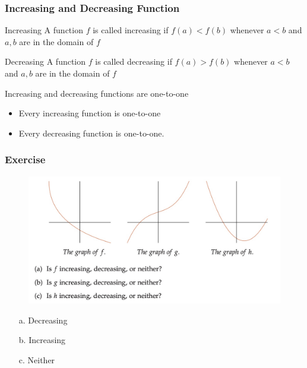\documentclass{beamer}
\begin{document}
  \begin{frame}
    \frametitle{Increasing and Decreasing Function}
    \begin{block}{Increasing}
      A function \(f\) is called increasing if \(f (a) < f (b)\) whenever \(a < b\) and \(a, b \) are in
the domain of \(f\)
    \end{block}
    \begin{block}{Decreasing}
      A function \(f\) is called decreasing if \(f (a) >  f (b)\) whenever \(a < b\) and \(a, b \) are in
the domain of \(f\)
    \end{block}
    \begin{alertblock}{Increasing and decreasing functions are one-to-one}
      \begin{itemize}
        \item Every increasing function is one-to-one
        \item Every decreasing function is one-to-one.
      \end{itemize}
    \end{alertblock}
  \end{frame}
  \begin{frame}
    \frametitle{Exercise}
    \begin{figure}
      \centering
      \includegraphics[scale=0.2]{increase.jpeg}
    \end{figure}
    \pause
  \begin{enumerate}
    \item[a.] Decreasing
    \item[b.] Increasing
    \item[c.] Neither
  \end{enumerate}
  \end{frame}
\end{document}
